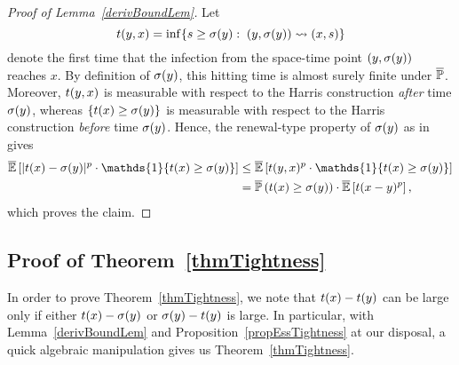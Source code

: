 \begin{proof}[Proof of Lemma~\ref{derivBoundLem}]
	Let 
	$$t(y, x) = \inf\{s \geq \sigma(y):\;(y, \sigma(y)) \rightsquigarrow (x, s)\}$$
	denote the first time that the infection from the space-time point $(y, \sigma(y))$ reaches $x$. By definition of $\sigma(y)$, this hitting time is almost surely finite under $\overline{\mathbb{P}}$. Moreover, $t(y, x)$ is measurable with respect to the Harris construction \emph{after} time $\sigma(y)$, whereas $\{t(x) \ge \sigma(y)\}$ is measurable with respect to the Harris construction \emph{before} time $\sigma(y)$. Hence, the renewal-type property of $\sigma(y)$ as in \cite[Lemma 8]{GaretMarch12} gives  
	\begin{align*}
	\oE\left[|t(x) - \sigma(y)|^p\cdot \mathds{1}\{t(x) \geq \sigma(y)\}\right] &\le \oE\left[t(y,x)^p \cdot \mathds{1}\{t(x) \geq \sigma(y)\} \right]\\& = \oP\left(t(x) \geq \sigma(y) \right) \cdot \oE\left[t(x-y)^p\right],
	\end{align*}
which proves the claim.

\end{proof}


\subsection{Proof of Theorem~\ref{thmTightness}}

In order to prove Theorem~\ref{thmTightness}, we note that $t(x) - t(y)$ can be large only if either $t(x) - \sigma(y)$ or $\sigma(y) - t(y)$ is large. In particular, with Lemma~\ref{derivBoundLem} and Proposition~\ref{propEssTightness} at our disposal, a quick algebraic manipulation gives us Theorem~\ref{thmTightness}. 


